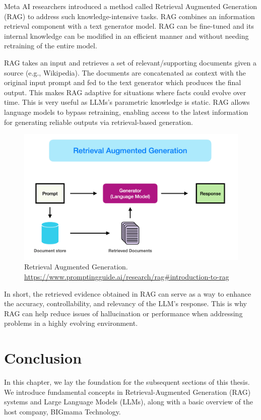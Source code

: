 Meta AI researchers introduced a method called Retrieval Augmented Generation (RAG) \cite{metaairag}  to address such knowledge-intensive tasks. RAG combines an information retrieval component with a text generator model. RAG can be fine-tuned and its internal knowledge can be modified in an efficient manner and without needing retraining of the entire model.

RAG takes an input and retrieves a set of relevant/supporting documents given a source (e.g., Wikipedia). The documents are concatenated as context with the original input prompt and fed to the text generator which produces the final output. This makes RAG adaptive for situations where facts could evolve over time. This is very useful as LLMs's parametric knowledge is static. RAG allows language models to bypass retraining, enabling access to the latest information for generating reliable outputs via retrieval-based generation.

\begin{figure}[!ht]
    \centering
    \includegraphics[width=\linewidth]{rag.png}
    \caption{Retrieval Augmented Generation. \url{https://www.promptingguide.ai/research/rag\#introduction-to-rag}}
    \label{fig:rag}
\end{figure}

In short, the retrieved evidence obtained in RAG can serve as a way to enhance the accuracy, controllability, and relevancy of the LLM's response. This is why RAG can help reduce issues of hallucination or performance when addressing problems in a highly evolving environment.

\section{Conclusion}

In this chapter, we lay the foundation for the subsequent sections of this thesis. We introduce fundamental concepts in Retrieval-Augmented Generation (RAG) systems and Large Language Models (LLMs), along with a basic overview of the host company, BIGmama Technology.